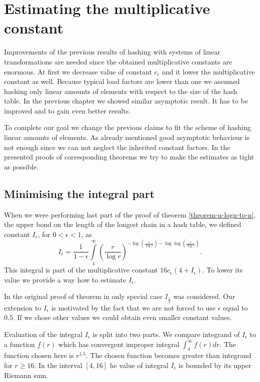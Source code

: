 \chapter{Estimating the multiplicative constant}
Improvements of the previous results of hashing with systems of linear transformations are needed since the obtained multiplicative constants are enormous. At first we decrease value of constant $c_\epsilon$ and it lower the multiplicative constant as well. Because typical load factors are lower than one we assumed hashing only linear amounts of elements with respect to the size of the hash table. In the previous chapter we showed similar asymptotic result. It has to be improved and to gain even better results.

To complete our goal we change the previous claims to fit the scheme of hashing linear amounts of elements. As already mentioned good asymptotic behaviour is not enough since we can not neglect the inherited constant factors. In the presented proofs of corresponding theorems we try to make the estimates as tight as possible.

\section{Minimising the integral part}
When we were performing last part of the proof of theorem \ref{theorem-n-logn-to-n}, the upper bond on the length of the longest chain in a hash table, we defined constant $I_\epsilon$, for $0 < \epsilon < 1$, as
\[
I_{\epsilon} = \frac{1}{1 - \epsilon} \displaystyle\int\limits_4^\infty \left(\frac{r}{\log r}\right)^{-\log \left(\frac{r}{\log r}\right) - \log \log \left(\frac{r}{\log r}\right)} \text{.}
\]
This integral is part of the multiplicative constant $16c_\epsilon(4 + I_\epsilon)$. To lower its value we provide a way how to estimate $I_\epsilon$.

In the original proof of theorem in \cite{DBLP:journals/jacm/AlonDMPT99} only special case $I_{\frac{1}{2}}$ was considered. Our extension to $I_\epsilon$ is motivated by the fact that we are not forced to use $\epsilon$ equal to $0.5$. If we chose other values we could obtain even smaller constant values.

Evaluation of the integral $I_\epsilon$ is split into two parts. We compare integrand of $I_\epsilon$ to a function $f(r)$ which has convergent improper integral $\int_{4}^{\infty} f(r) dr$. The function chosen here is $r^{1.5}$. The chosen function becomes greater than integrand for $r \geq 16$. In the interval $[4, 16]$ he value of integral $I_\epsilon$ is bounded by its upper Riemann sum.

